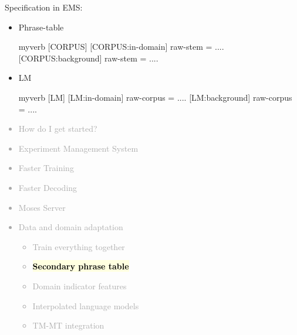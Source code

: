 \documentclass[landscape]{uedslides2C}
\newcommand{\currenttopic}[1]{\colorbox{lightyellow}{\textcolor{black}{\bf #1}}}
\begin{document}
\vspace{-1mm}
Specification in EMS:
\begin{itemize} \itemsep 5mm
\item Phrase-table\\[4mm] \small
    \begin{SaveVerbatim}{myverb} 
      [CORPUS]
      [CORPUS:in-domain]
      raw-stem = ....    
      [CORPUS:background]
      raw-stem = ....
    \end{SaveVerbatim}
    \colorbox{gray}{}
\item LM\\[4mm] \small
   \begin{SaveVerbatim}{myverb} 
      [LM]
      [LM:in-domain]
      raw-corpus = ....
      [LM:background]
      raw-corpus = ....
    \end{SaveVerbatim}
    \colorbox{gray}{}
\end{itemize}


\vspace{-5mm}
\textcolor{darkgrey}{
\begin{itemize} \itemsep -1mm
\item {How do I get started?}
\item {Experiment Management System}
\item {Faster Training}
\item {Faster Decoding}
\item {Moses Server}
\item {Data and domain adaptation}
  \begin{itemize}\vspace{-5mm}
  \item {Train everything together}
  \item \currenttopic{Secondary phrase table}
\item Domain indicator features
\item Interpolated language models
  \item TM-MT integration
  \end{itemize}
\end{itemize}
}

\end{document}
